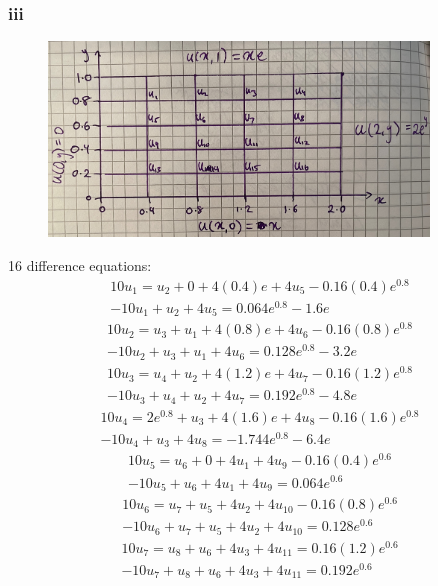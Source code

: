 \documentclass[11pt]{article}
\numberwithin{equation}{section}
\begin{document}
\subsubsection*{iii}
\begin{figure}[H]
	\centering
	\includegraphics[width = 0.9\textwidth]{./img/q2b.JPG}
	\caption{}
\end{figure}
16 difference equations:
\begin{gather}
	10u_1 = u_2 + 0 + 4(0.4)e + 4u_5 - 0.16(0.4)e^{0.8}\\
	-10u_1 + u_2 + 4u_5 = 0.064e^{0.8} -1.6e
\end{gather} 
\begin{gather}
	10u_2 = u_3 + u_1 + 4(0.8)e + 4u_6 - 0.16(0.8)e^{0.8}\\
	-10u_2 + u_3 + u_1 + 4u_6 = 0.128e^{0.8} - 3.2e
\end{gather}
\begin{gather}
	10u_3 = u_4 + u_2 + 4(1.2)e + 4u_7 - 0.16(1.2)e^{0.8}\\
	-10u_3 + u_4 + u_2 + 4u_7 = 0.192e^{0.8} - 4.8e
\end{gather}
\begin{gather}
	10u_4 = 2e^{0.8} + u_3 + 4(1.6)e + 4u_8 - 0.16(1.6)e^{0.8}\\
	-10u_4 + u_3 + 4u_8 = -1.744e^{0.8} - 6.4e
\end{gather}
\begin{align}
	10u_5 = u_6 + 0 + 4u_1 + 4u_9 -0.16(0.4)e^{0.6}\\
	-10u_5 + u_6 + 4u_1 + 4u_9 =0.064e^{0.6}
\end{align}
\begin{align}
	10u_6 = u_7 + u_5 +4u_2 +4u_{10} -0.16(0.8)e^{0.6}\\
	-10u_6 + u_7 + u_5 + 4u_2 + 4u_{10} =0.128e^{0.6}
\end{align}
\begin{align}
	10u_7 = u_8 + u_6 + 4u_3 + 4u_{11} = 0.16(1.2)e^{0.6}\\
	-10u_7 + u_8 + u_6 + 4u_3 + 4u_{11} = 0.192e^{0.6}
\end{align}
\end{document}
